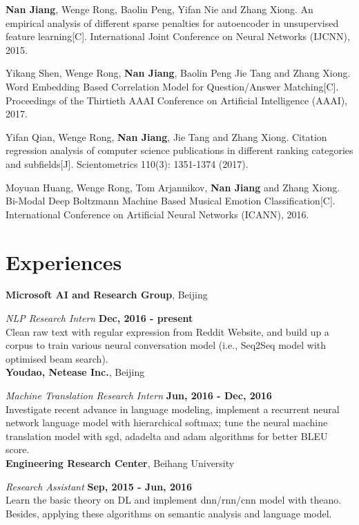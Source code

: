 \documentclass[margin,line]{resume}
\begin{document}
\begin{resume}
\textbf{Nan Jiang}, Wenge Rong, Baolin Peng, Yifan Nie and Zhang Xiong. An empirical analysis of different sparse penalties for autoencoder in unsupervised feature learning[C]. International Joint Conference on Neural Networks (IJCNN), 2015.

Yikang Shen, Wenge Rong, \textbf{Nan Jiang}, Baolin Peng Jie Tang and Zhang Xiong. Word Embedding Based Correlation Model for Question/Answer Matching[C]. Proceedings of the Thirtieth {AAAI} Conference on Artificial Intelligence (AAAI), 2017.

Yifan Qian, Wenge Rong, \textbf{Nan Jiang}, Jie Tang and Zhang Xiong. Citation regression analysis of computer science publications in different ranking categories and subfields[J]. Scientometrics 110(3): 1351-1374 (2017).

Moyuan Huang, Wenge Rong, Tom Arjannikov, \textbf{Nan Jiang} and Zhang Xiong. Bi-Modal Deep Boltzmann Machine Based Musical Emotion Classification[C]. International Conference on Artificial Neural Networks (ICANN), 2016.



\section{Experiences}
{\bf Microsoft AI and Research Group}, Beijing

{\em NLP Research Intern} \hfill {\bf Dec, 2016 - present}\\
Clean raw text with regular expression from Reddit Website, and build up a corpus to train various neural conversation model (i.e., Seq2Seq model with optimised beam search).\\


{\bf Youdao, Netease Inc.}, Beijing

{\em Machine Translation Research Intern} \hfill {\bf Jun, 2016 - Dec, 2016}\\
Investigate recent advance in language modeling, implement a recurrent neural network language model with hierarchical softmax; tune the neural machine translation model with sgd, adadelta and adam algorithms for better BLEU score.\\


{\bf Engineering Research Center}, Beihang University

{\em Research Assistant} \hfill {\bf Sep, 2015 - Jun, 2016}\\
Learn the basic theory on DL and implement dnn/rnn/cnn model with theano. Besides, applying these algorithms on semantic analysis and language model.




\end{resume}
\end{document}
